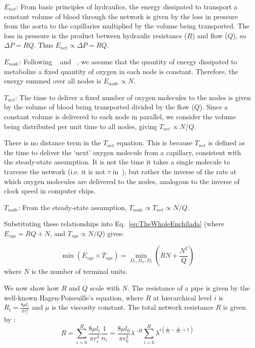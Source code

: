 \documentclass[12pt]{article}
\begin{document}
$E_{net}$: From basic principles of hydraulics, the energy dissipated to
transport a constant volume of blood through the network is given by the loss
in pressure from the aorta to the capillaries multiplied by the volume being
transported.  The loss in pressure is the product between hydraulic resistance ($R$) and
flow ($Q$), so $\Delta P = RQ$.  Thus $E_{net} \propto \Delta P = RQ$. 


$E_{node}$: Following ~\cite{west97} and ~\cite{moses08}, we assume that the
quantity of energy dissipated to metabolize a fixed quantity of oxygen in each
node is constant.  Therefore, the energy summed over all nodes is $E_{node} \propto
N$.

$T_{net}$: The time to deliver a fixed number of oxygen molecules to the nodes
is given by the volume of blood being transported divided by the flow ($Q$).
Since a constant volume is delivered to each node in parallel, we consider the
volume being distributed per unit time to all nodes, giving $T_{net}\propto
N/Q$.  

There is no distance term in the $T_{net}$ equation.  This is because $T_{net}$  is
defined as the time to deliver the `next'
oxygen molecule from a capillary, consistent with the
steady-state assumption.   It is not the time it takes a
single molecule to traverse the network (i.e. it is not $\tau$
in~\cite{banavar10}), but rather the inverse of the rate at which
oxygen molecules are delivered to the nodes, analogous to the inverse of clock speed in computer chips.

$T_{node}$: From the steady-state assumption, $T_{node} \propto T_{net} \propto N/Q$. 



Substituting these relationships into Eq.~\ref{eq:TheWholeEnchilada} (where $E_{sys} = RQ + N$, and $T_{sys} \propto N/Q$) gives:

\begin{equation}
 \min (E_{sys} \times T_{sys}) = \min_{D_r,D_w,D_l}(RN + \frac{N^2}{Q})
\label{eq:bio-min}
\end{equation}
\noindent where $N$ is the number of terminal units.  

We now show how $R$ and $Q$ scale with $N$. The resistance of a pipe is given by the well-known Hagen-Poiseuille's
equation, where $R$ at hierarchical level $i$ is $R_i = \frac{8\mu l_i}{\pi
r_i^4}$ and $\mu$ is the viscosity constant.  The total network resistance
$R$ is given by \cite{west97}:
\begin{equation}
\label{eq:resistance}
R = \sum_{i=0}^H \frac{8\mu l_i}{\pi r_i^4}\frac{1}{n_i}
= \frac{8\mu l_0}{\pi r_0^4} \lambda^{-H}\sum_{i=0}^H \lambda^{i 
\left(\frac{1}{D_l} - \frac{4}{D_r} + 1 \right)}
\end{equation}
\end{document}
